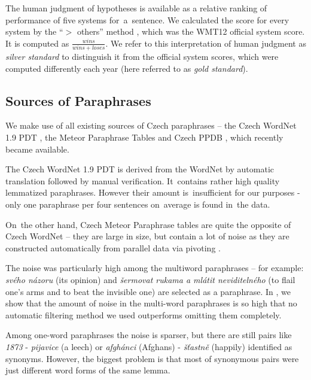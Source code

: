 \documentclass[11pt]{article}
\def\Tref#1{Table~\ref{#1}}
\begin{document}
The human judgment of hypotheses is available as a relative ranking of performance of 
five systems for~a~sentence. We calculated the score for every system by the “$ > $ others” 
method \cite{bojar-grains}, which was the WMT12 official system score. It is computed 
as $ \frac{wins}{wins+loses} $. We refer to this interpretation of human judgment as 
\textit{silver standard} to distinguish it from the official system scores, which were 
computed differently each year (here referred to as \textit{gold standard}).

\subsection{Sources of Paraphrases}
We make use of all existing sources of Czech paraphrases -- the Czech WordNet 1.9 PDT 
\cite{czech-wordnet}, the Meteor Paraphrase Tables \cite{meteor-tables} and Czech PPDB %
, which recently became available.

The Czech WordNet 1.9 PDT is derived from the WordNet \cite{wordnet} by automatic translation 
followed by manual verification. It~contains rather high quality lemmatized paraphrases. However 
their amount is~insufficient for our purposes %
- only one paraphrase per four sentences on~average is found in~the data. %

On~the other hand, Czech Meteor Paraphrase tables are quite the opposite of Czech WordNet -- 
they are large in size, but contain a lot of noise as they are constructed automatically 
from parallel data via pivoting \cite{pivoting}. 

The noise was particularly high among the multiword paraphrases -- for example: \textit{svého názoru} 
(its opinion) and \textit{šermovat rukama a mlátit neviditelného} (to flail one's arms and to beat 
the invisible one) are selected as a paraphrase. In , we show that the amount 
of noise in the multi-word paraphrases is so high that no automatic filtering method we used outperforms 
omitting them completely.

Among one-word paraphrases the noise is sparser, but there are still pairs like \textit{1873} - 
\textit{pijavice} (a leech) or \textit{afgh\'{a}nci} (Afghans) - \textit{š\v{t}astně} (happily) 
identified as synonyms. However, the biggest problem is that most of synonymous pairs were just 
different word forms of the same lemma. 
\end{document}
